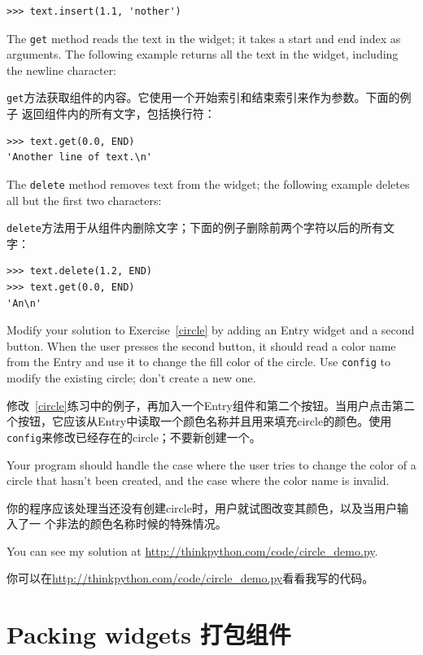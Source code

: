 \documentclass[10pt]{book}
\begin{document}
\begin{CJK}{UTF8}{gbsn}
\begin{verbatim}
>>> text.insert(1.1, 'nother')
\end{verbatim}
%
The {\tt get} method reads the text in the widget; it takes a start
and end index as arguments.  The following example returns all the
text in the widget, including the newline character:

{\tt get}方法获取组件的内容。它使用一个开始索引和结束索引来作为参数。下面的例子
返回组件内的所有文字，包括换行符：

\begin{verbatim}
>>> text.get(0.0, END)
'Another line of text.\n'
\end{verbatim}
%
The {\tt delete} method removes text from the widget;
the following example deletes all but the first two characters:

{\tt delete}方法用于从组件内删除文字；下面的例子删除前两个字符以后的所有文字：

\begin{verbatim}
>>> text.delete(1.2, END)
>>> text.get(0.0, END)
'An\n'
\end{verbatim}
%

\begin{exercise}
\label{circle2}

Modify your solution to Exercise~\ref{circle} by adding an
Entry widget and a second button.  When the user presses the
second button, it should read a color name from the Entry and
use it to change the fill color of the circle.  Use {\tt config}
to modify the existing circle; don't create a new one.

修改~\ref{circle}练习中的例子，再加入一个Entry组件和第二个按钮。当用户点击第二
个按钮，它应该从Entry中读取一个颜色名称并且用来填充circle的颜色。使用{\tt
config}来修改已经存在的circle；不要新创建一个。

Your program should handle the case where the user tries to
change the color of a circle that hasn't been created, and
the case where the color name is invalid.

你的程序应该处理当还没有创建circle时，用户就试图改变其颜色，以及当用户输入了一
个非法的颜色名称时候的特殊情况。

You can see my solution at \url{http://thinkpython.com/code/circle_demo.py}.

你可以在\url{http://thinkpython.com/code/circle_demo.py}看看我写的代码。


\end{exercise}


\section{Packing widgets 打包组件}


\end{CJK}
\end{document}
